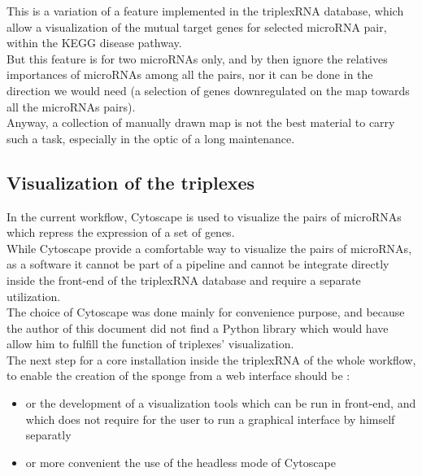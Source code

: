 \documentclass[a4paper,12pt]{report}
\begin{document}
This is a variation of a feature implemented in the triplexRNA database, which allow a visualization of the mutual target genes for selected microRNA pair, within the KEGG disease pathway. \\

But this feature is for two microRNAs only, and by then ignore the relatives importances of microRNAs among all the pairs, nor it can be done in the direction we would need (a selection of genes downregulated on the map towards all the microRNAs pairs).\\

Anyway, a collection of manually drawn map is not the best material to carry such a task, especially in the optic of a long maintenance.
 
\subsection{Visualization of the triplexes}

In the current workflow, Cytoscape\cite{cytoscape} is used to visualize the pairs of microRNAs which repress the expression of a set of genes.\\

While Cytoscape provide a comfortable way to visualize the pairs of microRNAs, as a software it cannot be part of a pipeline and cannot be integrate directly inside the front-end of the triplexRNA database and require a separate utilization.\\ 

The choice of Cytoscape was done mainly for convenience purpose, and because the author of this document did not find a Python library which would have allow him to fulfill the function of triplexes' visualization. \\

The next step for a core installation inside the triplexRNA of the whole workflow, to enable the creation of the sponge from a web interface should be :

\begin{itemize}
	\item or the development of a visualization tools which can be run in front-end, and which does not require for the user to run a graphical interface by himself separatly
	
	\item or more convenient the use of the headless mode of Cytoscape
	
\end{itemize}
\end{document}
